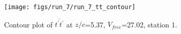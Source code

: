 \begin{figure}[H]
\centering
\texttt{[image: figs/run\_7/run\_7\_tt\_contour]}
\caption{Contour plot of $\overline{t^\prime t^\prime}$ at $z/c$=5.37, $V_{free}$=27.02, station 1.}
\label{fig:run_7_tt_contour}
\end{figure}



